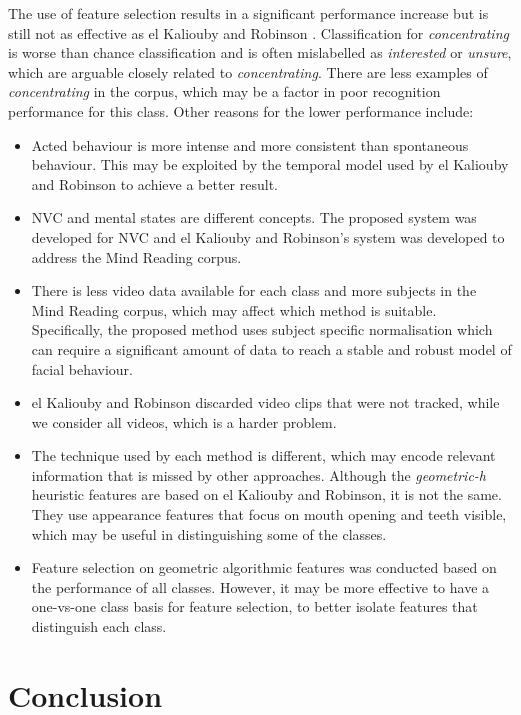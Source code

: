 The use of feature selection results in a significant performance increase but is still not as effective as el Kaliouby and Robinson \cite{ElKaliouby2004}. Classification for \textit{concentrating} is worse than chance classification and is often mislabelled as \textit{interested} or \textit{unsure}, which are arguable closely related to \textit{concentrating}. There are less examples of \textit{concentrating} in the corpus, which may be a factor in poor recognition performance for this class. Other reasons for the lower performance include:

\begin{itemize}
 \item Acted behaviour is more intense and more consistent than spontaneous behaviour. This may be exploited by the temporal model used by el Kaliouby and Robinson to achieve a better result.
 \item \ac{NVC} and mental states are different concepts. The proposed system was developed for \ac{NVC} and el Kaliouby and Robinson's system was developed to address the Mind Reading corpus.
 \item There is less video data available for each class and more subjects in the Mind Reading corpus, which may affect which method is suitable. Specifically, the proposed method uses subject specific normalisation which can require a significant amount of data to reach a stable and robust model of facial behaviour.
 \item el Kaliouby and Robinson discarded video clips that were not tracked, while we consider all videos, which is a harder problem.
 \item The \featureGeneration technique used by each method is different, which may encode relevant information that is missed by other \featureGeneration approaches. Although the \textit{geometric-h} heuristic features are based on el Kaliouby and Robinson, it is not the same. They use appearance features that focus on mouth opening and teeth visible, which may be useful in distinguishing some of the classes.
 \item Feature selection on geometric algorithmic features was conducted based on the performance of all classes. However, it may be more effective to have a one-vs-one class basis for feature selection, to better isolate features that distinguish each class.
\end{itemize}

\section{Conclusion}

